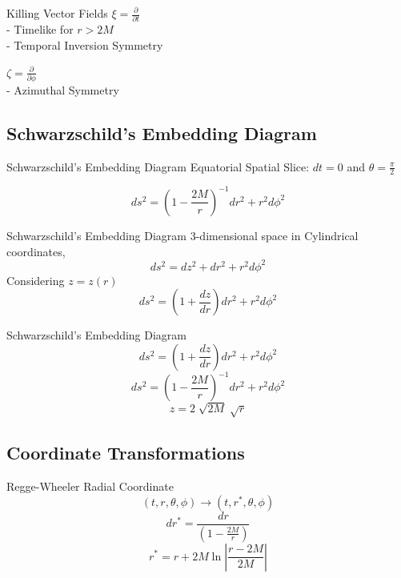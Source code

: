 \documentclass{beamer}
\begin{document}
  
  \begin{darkframes}
        \begin{frame}{Killing Vector Fields}
			$\xi = \frac{\partial}{\partial t}$\\
            \pause
            - Timelike for $r>2M$\\
            \pause
            - Temporal Inversion Symmetry\\
            \pause
            \bigskip
            
			$\zeta = \frac{\partial}{\partial\phi}$\\
            \pause
            - Azimuthal Symmetry            	
        \end{frame}
    
    
    \subsection{Schwarzschild's Embedding Diagram}
    	\begin{frame}{Schwarzschild's Embedding Diagram}
    		Equatorial Spatial Slice: $dt=0$ and $\theta = \frac{\pi}{2}$
            \pause
            
            $$ ds^2 = \left( 1 - \frac{2M}{r} \right)^{-1} dr^2 +  r^2 d\phi^2 $$
    	\end{frame}
        
        \begin{frame}{Schwarzschild's Embedding Diagram}
    		3-dimensional space in Cylindrical coordinates,
            $$ ds^2 = dz^2 + dr^2 + r^2 d\phi^2 $$
            \pause
            Considering $z = z(r)$
            \pause
            $$ ds^2 = \left( 1 + \frac{dz}{dr} \right) dr^2 + r^2 d\phi^2 $$
    	\end{frame}
        
        \begin{frame}{Schwarzschild's Embedding Diagram}
            $$ ds^2 = \left( 1 + \frac{dz}{dr} \right) dr^2 + r^2 d\phi^2 $$
            \pause
            $$ ds^2 = \left( 1 - \frac{2M}{r} \right)^{-1} dr^2 +  r^2 d\phi^2 $$
            \pause
            \bigskip
            $$ z = 2 \sqrt[]{2M} \sqrt[]{r} $$
    	\end{frame}
        
	\subsection{Coordinate Transformations} 
    	\begin{frame}{Regge-Wheeler Radial Coordinate}
        	$$ (t, r, \theta, \phi) \longrightarrow (t, r^*, \theta, \phi) $$
            \pause
            $$ dr^{*}= \frac{dr}{\left(1-\frac{2M}{r}\right)} $$
            \pause
        	$$ r^{*} = r + 2M \ln\left| \frac{r-2M}{2M}\right| $$
            \pause
            \bigskip
            

\end{frame}
\end{darkframes}
\end{document}
